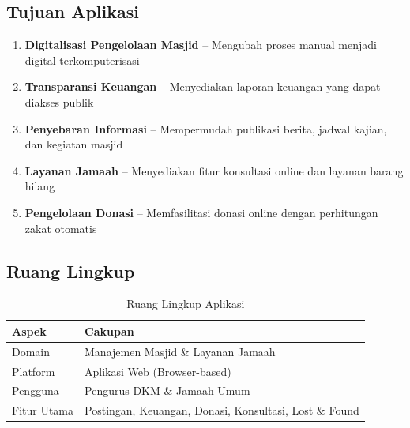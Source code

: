 \documentclass[12pt,a4paper]{article}
\begin{document}
\subsection{Tujuan Aplikasi}
\begin{enumerate}
    \item \textbf{Digitalisasi Pengelolaan Masjid} -- Mengubah proses manual menjadi digital terkomputerisasi
    \item \textbf{Transparansi Keuangan} -- Menyediakan laporan keuangan yang dapat diakses publik
    \item \textbf{Penyebaran Informasi} -- Mempermudah publikasi berita, jadwal kajian, dan kegiatan masjid
    \item \textbf{Layanan Jamaah} -- Menyediakan fitur konsultasi online dan layanan barang hilang
    \item \textbf{Pengelolaan Donasi} -- Memfasilitasi donasi online dengan perhitungan zakat otomatis
\end{enumerate}

\subsection{Ruang Lingkup}
\begin{table}[h]
\centering
\begin{tabular}{|l|l|}
\hline
\textbf{Aspek} & \textbf{Cakupan} \\
\hline
Domain & Manajemen Masjid \& Layanan Jamaah \\
Platform & Aplikasi Web (Browser-based) \\
Pengguna & Pengurus DKM \& Jamaah Umum \\
Fitur Utama & Postingan, Keuangan, Donasi, Konsultasi, Lost \& Found \\
\hline
\end{tabular}
\caption{Ruang Lingkup Aplikasi}
\end{table}
\end{document}
